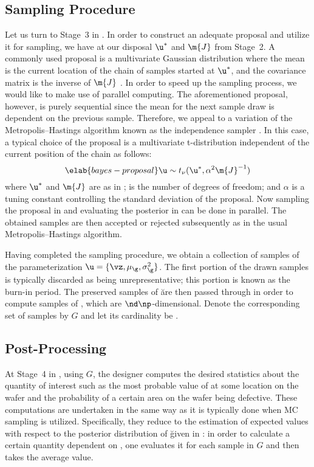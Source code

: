 \subsection{Sampling Procedure}

Let us turn to Stage~3 in . In order to construct an
adequate proposal and utilize it for sampling, we have at our disposal $\u^*$
and $\m{J}$ from Stage~2. A commonly used proposal is a multivariate Gaussian
distribution where the mean is the current location of the chain of samples
started at $\u^*$, and the covariance matrix is the inverse of $\m{J}$
\cite{gelman2013}. In order to speed up the sampling process, we would like to
make use of parallel computing. The aforementioned proposal, however, is purely
sequential since the mean for the next sample draw is dependent on the previous
sample. Therefore, we appeal to a variation of the Metropolis--Hastings
algorithm known as the independence sampler \cite{gelman2013}. In this case, a
typical choice of the proposal is a multivariate t-distribution independent of
the current position of the chain as follows:
\begin{equation} \elab{bayes-proposal}
  \u \sim t_\nu(\u^*, \alpha^2 \m{J}^{-1})
\end{equation}
where $\u^*$ and $\m{J}$ are as in ; \nu is the number
of degrees of freedom; and $\alpha$ is a tuning constant controlling the
standard deviation of the proposal. Now sampling the proposal in
 and evaluating the posterior in  can
be done in parallel. The obtained samples are then accepted or rejected
subsequently as in the usual Metropolis--Hastings algorithm.

Having completed the sampling procedure, we obtain a collection of samples of
the parameterization $\u = \{ \vz, \mu_\g, \sigma^2_\g \}$. The first portion of
the drawn samples is typically discarded as being unrepresentative; this portion
is known as the burn-in period. The preserved samples of \u are then passed
through  in order to compute samples of \g, which are $\nd
\np$-dimensional. Denote the corresponding set of samples by $G$ and let its
cardinality be \no.

\subsection{Post-Processing}

At Stage~4 in , using $G$, the designer computes the
desired statistics about the quantity of interest \g such as the most probable
value of \g at some location on the wafer and the probability of a certain area
on the wafer being defective. These computations are undertaken in the same way
as it is typically done when \ac{MC} sampling is utilized. Specifically, they
reduce to the estimation of expected values with respect to the posterior
distribution of \u given in : in order to calculate a
certain quantity dependent on \g, one evaluates it for each sample in $G$ and
then takes the average value.


